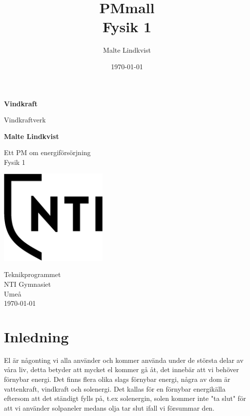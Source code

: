 \documentclass[11p]{article}
\title{PMmall \\ \small Fysik 1}
\author{Malte Lindkvist}
\date{\today}
\begin{document}
    \begin{titlepage}
        \begin{center}
            \vspace*{1cm}

            \Huge
            \textbf{Vindkraft}

            \vspace{0.5cm}
            \LARGE
            Vindkraftverk

            \vspace{1.5cm}

            \textbf{Malte Lindkvist}

            \vfill

            Ett PM om energiförsörjning \\
            Fysik 1

            \vspace{0.8cm}

            \includegraphics[width=0.4\textwidth]{NTI Gymnasiet_Symbol_print_svart.png}

            \Large
            Teknikprogrammet\\
            NTI Gymnasiet\\
            Umeå\\
            \today

        \end{center}
    \end{titlepage}

    \newpage
    \section{Inledning}
    El är någonting vi alla använder och kommer använda under de största delar av våra liv, detta betyder att mycket el kommer gå åt, det innebär att vi behöver förnybar energi.
    Det finns flera olika slags förnybar energi, några av dom är vattenkraft, vindkraft och solenergi. Det kallas för en förnybar energikälla eftersom att det ständigt fylls på, t.ex solenergin, solen kommer inte "ta slut" för att vi använder solpaneler medans olja tar slut ifall vi försummar den.
\end{document}
